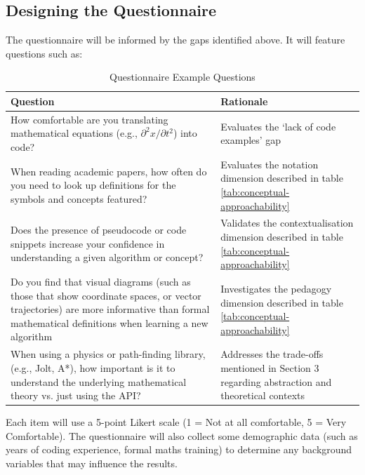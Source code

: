 \subsection{Designing the Questionnaire}

The questionnaire will be informed by the gaps identified above. It will feature questions such as:

\begin{table}[H]
    \centering
    \small
    \caption{Questionnaire Example Questions}
    \label{tab:questionnaire-examples}
    \begin{tabularx}{\textwidth}{@{} >{\hsize=0.8\hsize\raggedright\arraybackslash}X >{\hsize=0.6\hsize\raggedright\arraybackslash}X @{}} 
        \toprule
        \textbf{Question} & \textbf{Rationale} \\ \midrule
        How comfortable are you translating mathematical equations (e.g., \(\partial^2 x / \partial t^2\)) into code? & Evaluates the `lack of code examples' gap \\ \addlinespace
        When reading academic papers, how often do you need to look up definitions for the symbols and concepts featured? & Evaluates the notation dimension described in table \ref{tab:conceptual-approachability} \\ \addlinespace
        Does the presence of pseudo\-code or code snippets increase your confidence in understanding a given algorithm or concept? & Validates the contextualisation dimension described in table \ref{tab:conceptual-approachability} \\ \addlinespace
        Do you find that visual diagrams (such as those that show coordinate spaces, or vector trajectories) are more informative than formal mathematical definitions when learning a new algorithm & Investigates the pedagogy dimension described in table \ref{tab:conceptual-approachability} \\ \addlinespace
        When using a physics or path-finding library, (e.g., Jolt, A*), how important is it to understand the underlying mathematical theory vs. just using the API? & Addresses the trade-offs mentioned in Section 3 regarding abstraction and theoretical contexts \\ \bottomrule
    \end{tabularx}
\end{table}

Each item will use a 5-point Likert scale (1 = Not at all comfortable, 5 = Very Comfortable). The questionnaire will also collect some demographic data (such as years of coding
experience, formal maths training) to determine any background variables that may influence the results.


